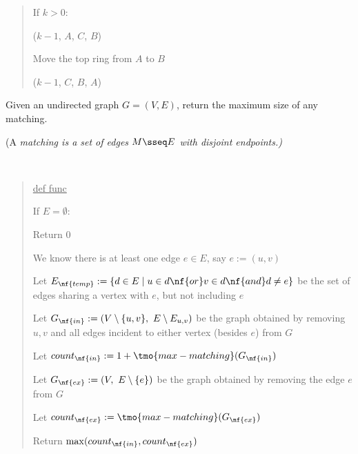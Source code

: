 \documentclass[10pt]{article}
\begin{document}
\begin{solution}
\begin{quote}
%

\begin{steps}
  \item If \( k > 0 \):
    \begin{steps}
    \item {}(\( k-1 \), \( A \), \( C \), \( B \))
    \item Move the top ring from \( A \) to \( B \)
    \item {}(\( k-1 \), \( C \), \( B \), \( A \))
    \end{steps}
\end{steps}
\end{quote}
\end{solution}
\pagebreak

Given an undirected graph \( G = (V, E) \), return the maximum size of any matching.

(A \it{matching} is a set of edges \( M \sseq E \) with disjoint endpoints.)

\begin{solution}\ %
\begin{quote}%
\noindent\ul{def func }%

%

\begin{steps}
  \item If \( E = \emptyset \):
    \begin{steps}
    \item Return 0
    \end{steps}
  \item We know there is at least one edge \( e \in E \), say \( e := (u, v) \)
  \item Let \( E_{\nf{temp}} := \{d\in E \mid u\in d \nf{ or } v\in d \nf{ and } d\neq e\} \) be the set of edges sharing a vertex with \( e \), but not including \( e \)
  \item Let \( G_{\nf{in}} := (V\setminus \{u,v\},\ E\setminus E_{u,v}) \) be the graph obtained by removing  \( u,v \) and all edges incident to either vertex (besides \( e \)) from \( G \)
  \item Let \( count_{\nf{in}} := 1+\tmo{max-matching}(G_{\nf{in}}) \) 
  \item Let \( G_{\nf{ex}} := (V,\ E\setminus\{e\}) \) be the graph obtained by removing the edge \( e \) from \( G \)
  \item Let \( count_{\nf{ex}} := \tmo{max-matching}(G_{\nf{ex}}) \) 
  \item Return \( \max(count_{\nf{in}}, count_{\nf{ex}}) \)
\end{steps}
\end{quote}%
\end{solution}%
\pagebreak
\end{document}

